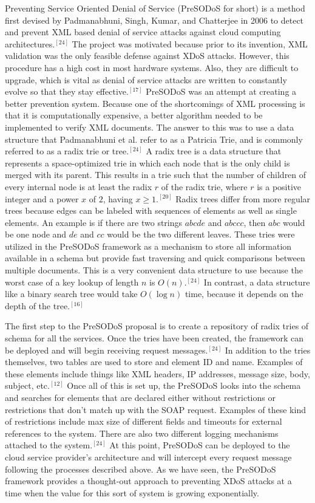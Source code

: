 \documentclass[a4paper, 8pt]{article} %
\begin{document}
\begin{doublespacing}
Preventing Service Oriented Denial of Service (PreSODoS for short) is a method first devised by Padmanabhuni, Singh, Kumar, and Chatterjee in 2006 to detect and prevent XML based denial of service attacks against cloud computing architectures.$^{[24]}$  The project was motivated because prior to its invention, XML validation was the only feasible defense against XDoS attacks.  However, this procedure has a high cost in most hardware systems.  Also, they are difficult to upgrade, which is vital as denial of service attacks are written to constantly evolve so that they stay effective.$^{[17]}$  PreSODoS was an attempt at creating a better prevention system.  Because one of the shortcomings of XML processing is that it is computationally expensive, a better algorithm needed to be implemented to verify XML documents.  The answer to this was to use a data structure that Padmanabhuni et al. refer to as a Patricia Trie, and is commonly referred to as a radix trie or tree.$^{[24]}$  A radix tree is a data structure that represents a space-optimized trie in which each node that is the only child is merged with its parent.  This results in a trie such that the number of children of every internal node is at least the radix $r$ of the radix trie, where $r$ is a positive integer and a power $x$ of $2$, having $x \geq 1$.$^{[20]}$  Radix trees differ from more regular trees because edges can be labeled with sequences of elements as well as single elements.  An example is if there are two strings $abcde$ and $abccc$, then $abc$ would be one node and $de$ and $cc$ would be the two different leaves.  These tries were utilized in the PreSODoS framework as a mechanism to store all information available in a schema but provide fast traversing and quick comparisons between multiple documents.  This is a very convenient data structure to use because the worst case of a key lookup of length $n$ is $O(n)$.$^{[24]}$  In contrast, a data structure like a binary search tree would take $O(\log n)$ time, because it depends on the depth of the tree.$^{[16]}$  

The first step to the PreSODoS proposal is to create a repository of radix tries of schema for all the services.  Once the tries have been created, the framework can be deployed and will begin receiving request messages.$^{[24]}$  In addition to the tries themselves, two tables are used to store and element ID and name.  Examples of these elements include things like XML headers, IP addresses, message size, body, subject, etc.$^{[12]}$  Once all of this is set up, the PreSODoS looks into the schema and searches for elements that are declared either without restrictions or restrictions that don't match up with the SOAP request.  Examples of these kind of restrictions include max size of different fields and timeouts for external references to the system.  There are also two different logging mechanisms attached to the system.$^{[24]}$  At this point, PreSODoS can be deployed to the cloud service provider's architecture and will intercept every request message following the processes described above.  As we have seen, the PreSODoS framework provides a thought-out approach to preventing XDoS attacks at a time when the value for this sort of system is growing exponentially.  


\end{doublespacing}
\end{document}
